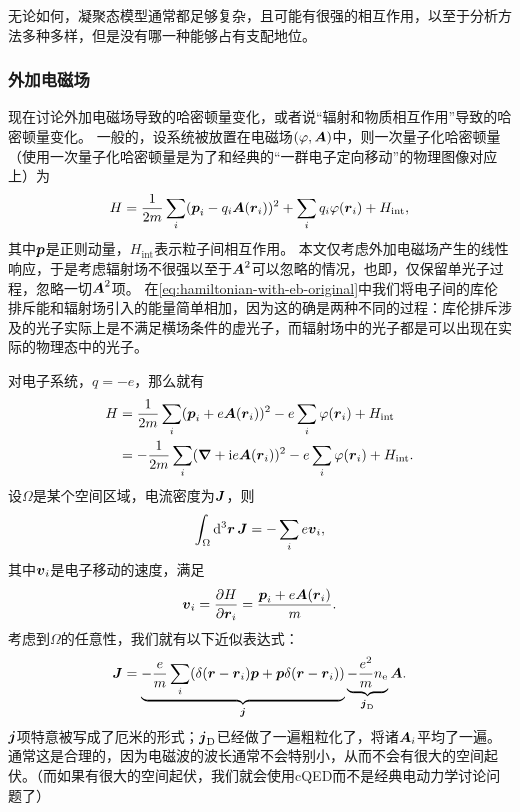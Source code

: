 \documentclass[hyperref, UTF8, a4paper]{ctexart}
\newcommand*{\ii}{\mathrm{i}}
\begin{document}
无论如何，凝聚态模型通常都足够复杂，且可能有很强的相互作用，以至于分析方法多种多样，但是没有哪一种能够占有支配地位。

\subsubsection{外加电磁场}

现在讨论外加电磁场导致的哈密顿量变化，或者说“辐射和物质相互作用”导致的哈密顿量变化。
一般的，设系统被放置在电磁场$(\varphi, \vb*{A})$中，则一次量子化哈密顿量（使用一次量子化哈密顿量是为了和经典的“一群电子定向移动”的物理图像对应上）为
\begin{equation}
    {H} = \frac{1}{2m} \sum_i ({\vb*{p}_i} - q_i \vb*{A}({\vb*{r}_i}))^2 + \sum_i q_i \varphi({\vb*{r}}_i) + {H}_\text{int},
    \label{eq:hamiltonian-with-eb-original}
\end{equation}
其中$\vb*{p}$是正则动量，${H}_\text{int}$表示粒子间相互作用。
本文仅考虑外加电磁场产生的线性响应，于是考虑辐射场不很强以至于$\vb*{A}^2$可以忽略的情况，也即，仅保留单光子过程，忽略一切$\vb*{A}^2$项。
在\eqref{eq:hamiltonian-with-eb-original}中我们将电子间的库伦排斥能和辐射场引入的能量简单相加，因为这的确是两种不同的过程：库伦排斥涉及的光子实际上是不满足横场条件的虚光子，而辐射场中的光子都是可以出现在实际的物理态中的光子。

对电子系统，$q=-e$，那么就有
\begin{equation}
    \begin{aligned}
        {H} &= \frac{1}{2m} \sum_i ({\vb*{p}_i} + e \vb*{A}({\vb*{r}_i}))^2 - e \sum_i \varphi({\vb*{r}}_i) + {H}_\text{int} \\ 
        &= - \frac{1}{2m} \sum_i (\grad + \ii e \vb*{A}({\vb*{r}_i}))^2 - e \sum_i \varphi({\vb*{r}}_i) + {H}_\text{int}.
    \end{aligned}
\end{equation}
设$\Omega$是某个空间区域，电流密度为$\vb*{J}$，则
\begin{equation}
    \int_\Omega \dd[3]{\vb*{r}} {\vb*{J}} = - \sum_i e {\vb*{v}}_i,
\end{equation}
其中$\vb*{v}_i$是电子移动的速度，满足
\begin{equation}
    {\vb*{v}}_i = \pdv{H}{\vb*{r}_i} = \frac{{\vb*{p}}_i + e \vb*{A}({\vb*{r}}_i)}{m}.
\end{equation}
考虑到$\Omega$的任意性，我们就有以下近似表达式：
\begin{equation}
    {\vb*{J}} = \underbrace{- \frac{e}{m} \sum_i ( \delta(\vb*{r} - {\vb*{r}}_i) {\vb*{p}} + {\vb*{p}} \delta(\vb*{r} - {\vb*{r}}_i) )}_{{\vb*{j}}} \underbrace{- \frac{e^2}{m} {n}_\text{e}}_{{\vb*{j}}_\text{D}} \vb*{A}.
\end{equation}
${\vb*{j}}$项特意被写成了厄米的形式；${\vb*{j}}_\text{D}$已经做了一遍粗粒化了，将诸$\vb*{A}_i$平均了一遍。
通常这是合理的，因为电磁波的波长通常不会特别小，从而不会有很大的空间起伏。（而如果有很大的空间起伏，我们就会使用cQED而不是经典电动力学讨论问题了）
\end{document}
